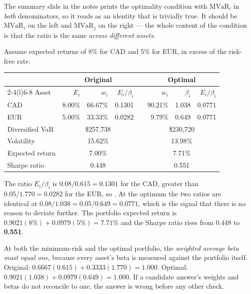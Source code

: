 \begin{imtrapbox}[breakable=false,title={A subscript the source notes lost}]
The summary slide in the notes prints the optimality condition with
$\text{MVaR}_i$ in \emph{both} denominators, so it reads as an identity that is
trivially true. It should be $\text{MVaR}_i$ on the left and $\text{MVaR}_j$ on
the right --- the whole content of the condition is that the ratio is the same
\emph{across different assets}.
\end{imtrapbox}

\begin{imexbox}[title={Calculating the return-optimizing position}]
Assume expected returns of 8\% for CAD and 5\% for EUR, in excess of the risk-free
rate.
\begin{center}\small
\begin{tabular}{@{}lrrrcrrr@{}}
\toprule
& \multicolumn{3}{c}{\textbf{Original}} & & \multicolumn{3}{c}{\textbf{Optimal}} \\
\cmidrule(r){2-4}\cmidrule(l){6-8}
Asset & $E_i$ & $w_i$ & $E_i/\beta_i$ & & $w_i$ & $\beta_i$ & $E_i/\beta_i$ \\
\midrule
CAD & 8.00\% & 66.67\% & 0.1301 & & 90.21\% & 1.038 & 0.0771 \\
EUR & 5.00\% & 33.33\% & 0.0282 & & \phantom{0}9.79\% & 0.649 & 0.0771 \\
\midrule
Diversified VaR & \multicolumn{3}{c}{\$257,738} & & \multicolumn{3}{c}{\$230,720} \\
Volatility & \multicolumn{3}{c}{15.62\%} & & \multicolumn{3}{c}{13.98\%} \\
Expected return & \multicolumn{3}{c}{7.00\%} & & \multicolumn{3}{c}{7.71\%} \\
Sharpe ratio & \multicolumn{3}{c}{0.448} & & \multicolumn{3}{c}{0.551} \\
\bottomrule
\end{tabular}
\end{center}
\medskip
The ratio $E_i/\beta_i$ is $0.08/0.615 = 0.1301$ for the CAD, greater than
$0.05/1.770 = 0.0282$ for the EUR, so .
At the optimum the two ratios are identical at
$0.08/1.038 = 0.05/0.649 = 0.0771$, which is the signal that there is no reason to
deviate further. The portfolio expected return is
$0.9021(8\%) + 0.0979(5\%) = 7.71\%$ and the Sharpe ratio rises from 0.448 to
\textbf{0.551}.
\end{imexbox}

\begin{imkeybox}[title={A check that always works}]
At both the minimum-risk and the optimal portfolio, the \emph{weighted average
beta must equal one}, because every asset's beta is measured against the portfolio
itself. Original: $0.6667(0.615) + 0.3333(1.770) = 1.000$. Optimal:
$0.9021(1.038) + 0.0979(0.649) = 1.000$. If a candidate answer's weights and betas
do not reconcile to one, the answer is wrong before any other check.
\end{imkeybox}

